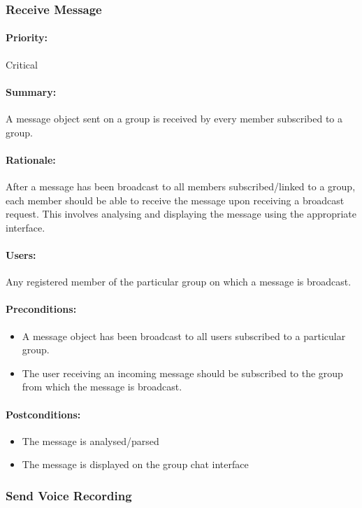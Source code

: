 \documentclass[11pt]{article}
\begin{document}
\subsubsection{Receive Message} \label{UC-send-message}
\paragraph{Priority:} Critical
\paragraph{Summary:} A message object sent on a group is received by every member subscribed to a group.
\paragraph{Rationale:} After a message has been broadcast to all members subscribed/linked to a group, each member should be able to receive the message upon receiving a broadcast request. This involves analysing and displaying the message using the appropriate interface. 
\paragraph{Users:} Any registered member of the particular group on which a message is broadcast.
\paragraph{Preconditions:} 
\begin{itemize}
\item A message object has been broadcast to all users subscribed to a particular group.
\item The user receiving an incoming message should be subscribed to the group from which the message is broadcast.
\end{itemize}
\paragraph{{Postconditions:}}
\begin{itemize}
\item The message is analysed/parsed
\item The message is displayed on the group chat interface
\end{itemize}

\subsubsection{Send Voice Recording} \label{UC-send-voice}
\end{document}

